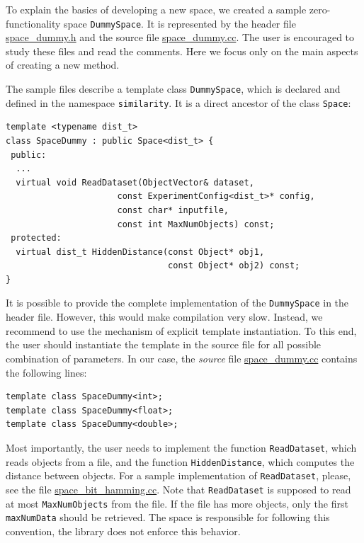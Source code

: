 \documentclass[runningheads,a4paper]{llncs}
\newcommand{\ttt}[1]{\texttt{#1}}
\begin{document}
{To explain the basics of developing a new space,
we created a sample zero-functionality space \texttt{DummySpace}.
It is represented by 
the header file 
\href{https://github.com/searchivarius/NonMetricSpaceLib/blob/master/similarity_search/include/space/space_dummy.h}{space\_dummy.h}
and the source file
\href{https://github.com/searchivarius/NonMetricSpaceLib/blob/master/similarity_search/src/space/space_dummy.cc}{space\_dummy.cc}.
The user is encouraged to study these files and read the comments.
Here we focus only on the main aspects of creating a new method.
\newpage

The sample files describe a template class \ttt{DummySpace}, 
which is declared and defined in the namespace \ttt{similarity}.
It is a direct ancestor of the class \ttt{Space}:
\begin{verbatim}
template <typename dist_t>
class SpaceDummy : public Space<dist_t> {
 public:
  ...
  virtual void ReadDataset(ObjectVector& dataset,
                      const ExperimentConfig<dist_t>* config,
                      const char* inputfile,
                      const int MaxNumObjects) const;
 protected:
  virtual dist_t HiddenDistance(const Object* obj1, 
                                const Object* obj2) const;
}
\end{verbatim}
It is possible to provide the complete implementation of the \ttt{DummySpace}
in the header file. However, this would make compilation very slow.
Instead, we recommend to use the mechanism of explicit template instantiation.
To this end, the user should instantiate the template in the source file
for all possible combination of parameters.
In our case, the \emph{source} file 
\href{https://github.com/searchivarius/NonMetricSpaceLib/blob/master/similarity_search/src/space/space_dummy.cc}{space\_dummy.cc}
contains the following lines:
\begin{verbatim}
template class SpaceDummy<int>;
template class SpaceDummy<float>;
template class SpaceDummy<double>;
\end{verbatim}

Most importantly, the user needs to implement the function \ttt{ReadDataset},
which reads objects from a file, and the function \ttt{HiddenDistance},
which computes the distance between objects.
For a sample implementation of \ttt{ReadDataset},
please, see the file
\href{https://github.com/searchivarius/NonMetricSpaceLib/blob/master/similarity_search/src/space/space_bit_hamming.cc}{space\_bit\_hamming.cc}.
Note that \ttt{ReadDataset} is supposed to read at most \ttt{MaxNumObjects}
from the file. If the file has more objects, only the first \ttt{maxNumData} should be retrieved.
The space is responsible for following this convention, the library does not enforce this behavior.

}
\end{document}
